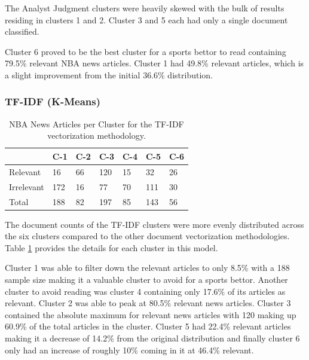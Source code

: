 \documentclass[5p,authoryear]{elsarticle}
\begin{document}
The Analyst Judgment clusters were heavily skewed with the bulk of results residing in clusters 1 and 2. 
Cluster 3 and 5 each had only a single document classified. 

Cluster 6 proved to be the best cluster for a sports bettor to read containing 79.5\% relevant NBA news articles. 
Cluster 1 had 49.8\% relevant articles, which is a slight improvement from the initial 36.6\% distribution.


\subsubsection{TF-IDF (K-Means)}\label{tfidf}



\begin{table}[!htb] 
  \centering 
  \begin{tabular}{@{\small}lllllll@{}} 
    \toprule %
    & {\footnotesize C-1} &  {\footnotesize C-2} & {\footnotesize  C-3} & {\footnotesize  C-4} & {\footnotesize  C-5} & {\footnotesize  C-6} \\ \midrule
    Relevant & 16 & 66 & 120 & 15 & 32 & 26 \\
    Irrelevant & 172 & 16 & 77 & 70 & 111 & 30 \\
    Total & 188 & 82 & 197 & 85 & 143 & 56 \\
    \bottomrule
\end{tabular} \caption{NBA News Articles per Cluster for the TF-IDF vectorization methodology.} \label{table_tfidf}
\end{table}


The document counts of the TF-IDF clusters were more evenly distributed across the six clusters compared to the other document vectorization methodologies. 
Table \ref{table_tfidf} provides the details for each cluster in this model.

Cluster 1 was able to filter down the relevant articles to only 8.5\% with a 188 sample size making it a valuable cluster to avoid for a sports bettor. 
Another cluster to avoid reading was cluster 4 containing only 17.6\% of its articles as relevant. 
Cluster 2 was able to peak at 80.5\% relevant news articles.
Cluster 3 contained the absolute maximum for relevant news articles with 120 making up 60.9\% of the total articles in the cluster.
Cluster 5 had 22.4\% relevant articles making it a decrease of 14.2\% from the original distribution and finally cluster 6 only had an increase of roughly 10\% coming in it at 46.4\% relevant.
\end{document}
